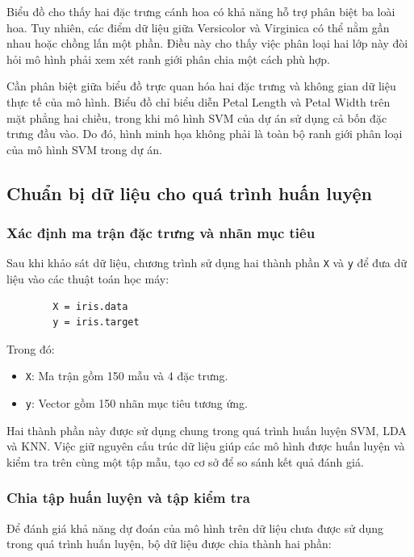 \documentclass[14pt]{extarticle}
\begin{document}
	Biểu đồ cho thấy hai đặc trưng cánh hoa có khả năng hỗ trợ phân biệt ba loài hoa. Tuy nhiên, các điểm dữ liệu giữa Versicolor và Virginica có thể nằm gần nhau hoặc chồng lấn một phần. Điều này cho thấy việc phân loại hai lớp này đòi hỏi mô hình phải xem xét ranh giới phân chia một cách phù hợp.
	
	Cần phân biệt giữa biểu đồ trực quan hóa hai đặc trưng và không gian dữ liệu thực tế của mô hình. Biểu đồ chỉ biểu diễn Petal Length và Petal Width trên mặt phẳng hai chiều, trong khi mô hình SVM của dự án sử dụng cả bốn đặc trưng đầu vào. Do đó, hình minh họa không phải là toàn bộ ranh giới phân loại của mô hình SVM trong dự án.
	
	\subsection{Chuẩn bị dữ liệu cho quá trình huấn luyện}
	
	\subsubsection{Xác định ma trận đặc trưng và nhãn mục tiêu}
	
	Sau khi khảo sát dữ liệu, chương trình sử dụng hai thành phần \texttt{X} và \texttt{y} để đưa dữ liệu vào các thuật toán học máy:
	
	\begin{verbatim}
		X = iris.data
		y = iris.target
	\end{verbatim}
	
	Trong đó:
	
	\begin{itemize}
		\item \texttt{X}: Ma trận gồm 150 mẫu và 4 đặc trưng.
		\item \texttt{y}: Vector gồm 150 nhãn mục tiêu tương ứng.
	\end{itemize}
	
	Hai thành phần này được sử dụng chung trong quá trình huấn luyện SVM, LDA và KNN. Việc giữ nguyên cấu trúc dữ liệu giúp các mô hình được huấn luyện và kiểm tra trên cùng một tập mẫu, tạo cơ sở để so sánh kết quả đánh giá.
	
	\subsubsection{Chia tập huấn luyện và tập kiểm tra}
	
	Để đánh giá khả năng dự đoán của mô hình trên dữ liệu chưa được sử dụng trong quá trình huấn luyện, bộ dữ liệu được chia thành hai phần:
	
\end{document}
